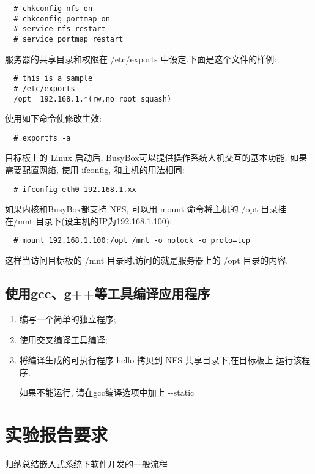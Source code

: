 \begin{boxedminipage}{.9\textwidth}
\begin{verbatim}
  # chkconfig nfs on
  # chkconfig portmap on
  # service nfs restart
  # service portmap restart
\end{verbatim}
\end{boxedminipage}

服务器的共享目录和权限在 /etc/exports 中设定.下面是这个文件的样例:

\begin{boxedminipage}{.9\textwidth}
\begin{verbatim}
  # this is a sample
  # /etc/exports
  /opt  192.168.1.*(rw,no_root_squash)
\end{verbatim}
\end{boxedminipage}

使用如下命令使修改生效:

\begin{boxedminipage}{.9\textwidth}
\begin{verbatim}
  # exportfs -a
\end{verbatim}
\end{boxedminipage}

    目标板上的 Linux 启动后, BusyBox可以提供操作系统人机交互的基本功能.
如果需要配置网络, 使用 ifconfig, 和主机的用法相同:

\begin{boxedminipage}{.9\textwidth}
\begin{verbatim}
  # ifconfig eth0 192.168.1.xx
\end{verbatim}
\end{boxedminipage}

如果内核和BusyBox都支持 NFS, 可以用 mount 命令将主机的 /opt 目录挂在/mnt 
目录下(设主机的IP为192.168.1.100):

\begin{boxedminipage}{.9\textwidth}
\begin{verbatim}
  # mount 192.168.1.100:/opt /mnt -o nolock -o proto=tcp
\end{verbatim}
\end{boxedminipage}

 这样当访问目标板的 /mnt 目录时,访问的就是服务器上的 /opt 目录的内容.

\subsection{使用gcc、g++等工具编译应用程序}
\begin{enumerate}\itemsep=-3pt
  \item 编写一个简单的独立程序;
  \item 使用交叉编译工具编译;
  \item 将编译生成的可执行程序 hello 拷贝到 NFS 共享目录下,在目标板上
		运行该程序.

        如果不能运行, 请在gcc编译选项中加上 -{}-static
\end{enumerate}

\section{实验报告要求}
    归纳总结嵌入式系统下软件开发的一般流程
